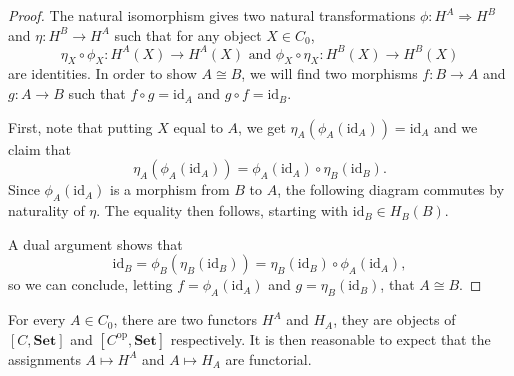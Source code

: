 \documentclass{article}
\theoremstyle{definition}
\theoremstyle{remark}
\newcommand{\id}{\text{id}}
\newcommand{\op}[1]{#1^{\text{op}}}
\begin{document}
\begin{proof}
	The natural isomorphism gives two natural transformations $\phi: H^A \Rightarrow H^B$ and $\eta: H^B \rightarrow H^A$ such that for any object $X \in C_0$, \[\eta_X \circ \phi_X:H^A(X)\rightarrow H^A(X) \text{  and  } \phi_X \circ \eta_X:H^B(X) \rightarrow H^B(X)\] are identities. In order to show $A \cong B$, we will find two morphisms $f:B\rightarrow A$ and $g:A\rightarrow B$ such that $f\circ g = \id_A$ and $g\circ f = \id_B$.
	
	First, note that putting $X$ equal to $A$, we get $\eta_A(\phi_A(\id_A)) = \id_A$ and we claim that \[\eta_A(\phi_A(\id_A)) =\phi_A(\id_A) \circ \eta_B(\id_B).\]
	Since $\phi_A(\id_A)$ is a morphism from $B$ to $A$, the following diagram commutes by naturality of $\eta$. The equality then follows, starting with $\id_B \in H_B(B)$.
	\begin{figure}[h]
		\centering
	\end{figure}

	A dual argument shows that \[\id_B = \phi_B(\eta_B(\id_B)) =  \eta_B(\id_B) \circ \phi_A(\id_A),\]
	so we can conclude, letting $f = \phi_A(\id_A)$ and $g= \eta_B(\id_B)$, that $A \cong B$.
\end{proof}

For every $A \in C_0$, there are two functors $H^A$ and $H_A$, they are objects of $[C, \textbf{Set}]$ and $[\op{C}, \textbf{Set}]$ respectively. It is then reasonable to expect that the assignments $A \mapsto H^A$ and $A \mapsto H_A$ are functorial.
\end{document}

